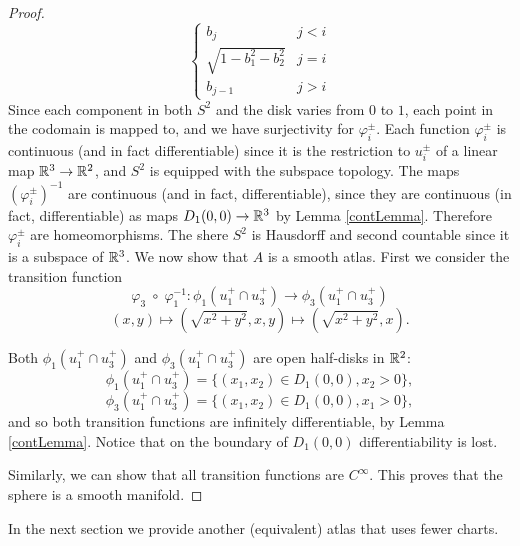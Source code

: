 \documentclass[11pt,a4paper]{report}
\begin{document}
\begin{proof}
\[\begin{cases}
                                   b_j & j<i \\
                                   \sqrt{1-b_1^2-b_2^2} & j=i \\
                                   b_{j-1} & j>i
  \end{cases}
\]
Since each component in both $S^2$ and the disk varies from $0$ to $1$, each point in the codomain is mapped to, and we have surjectivity for $\varphi_i^{\pm}$.
\newline
Each function $\varphi_i^{\pm}$ is continuous (and in fact differentiable) since it is the restriction to $u_i^{\pm}$ of a linear
map $\mathbb{R}^3\to \mathbb{R}^2$, and $S^2$ is equipped with the subspace topology.  The maps $\left(\varphi_i^{\pm}\right)^{-1}$ are continuous (and in fact, differentiable),
since they are continuous (in fact, differentiable) as maps $D_1(0,0)\to \mathbb{R}^3$ by Lemma
%
 \ref{contLemma}.
  Therefore $\varphi_{i}^{\pm}$ are homeomorphisms.
% 
\newline
The shere $S^2$ is Hausdorff and second countable since it is a subspace of $\mathbb{R}^3$.
\newline
We now show that $A$ is a smooth atlas. First we consider the transition function
%
%
%
 \[ 
	\varphi_3 \; \circ \; \varphi_1^{-1}: \phi_1(u_1^{+}\cap u_3^+) \longrightarrow \phi_3(u_1^+\cap u_3^{+})
 \]
$$(x,y) \mapsto (\sqrt{x^2+y^2},x,y) \mapsto (\sqrt{x^2+y^2},x).$$
%

    Both $\phi_1(u_1^{+}\cap u_3^+)$ and $\phi_3(u_1^{+}\cap u_3^+)$ are open half-disks in $\mathbb{R}^2$:
    \[
    	\phi_1(u_1^{+}\cap u_3^+)=\{(x_1,x_2)\in D_1(0,0), x_2>0\},\]
    \[ \phi_3(u_1^{+}\cap u_3^+)=\{(x_1,x_2)\in D_1(0,0),  x_1>0\},
    \]
    and so both transition functions are infinitely differentiable, by Lemma \ref{contLemma}. Notice that on the boundary of
    $D_1(0,0)$ differentiability is lost.




Similarly, we can show that all transition functions are $C^{\infty}$.
This proves that the sphere is a smooth manifold.
\end{proof}
\noindent In the next section we provide another (equivalent) atlas  that uses fewer charts.
\end{document}
